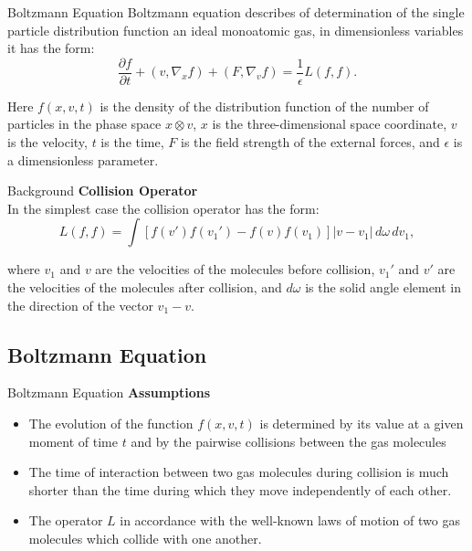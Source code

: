 \documentclass[12pt,xcolor={table,dvipsnames},t]{beamer}
\begin{document}
\begin{frame}{Boltzmann Equation}
Boltzmann equation describes of determination of the single particle distribution function an ideal monoatomic gas, in dimensionless variables it has the form:
\begin{equation}
    \frac{\partial f}{\partial t}+(v,\nabla_xf)+(F,\nabla_vf)=\frac1\epsilon L(f,f).\label{*}\tag{*} 
\end{equation}

Here $f(x,v,t)$ is the density of the distribution function of the number of particles in the phase space $x\otimes v$, $x$ is the three-dimensional space coordinate, $v$ is the velocity, $t$ is the time, $F$ is the field strength of the external forces, and $\epsilon$ is a dimensionless parameter. 
\end{frame}


\begin{frame}{Background}
\textbf{Collision Operator}\\
 In the simplest case the collision operator has the form:
\begin{equation}
L(f,f)=\int[f(v')f(v_1')-f(v)f(v_1)]|v-v_1|\,d\omega\,dv_1, 
\end{equation}

where $v_1$ and $v$ are the velocities of the molecules before collision, $v_1'$ and $v'$ are the velocities of the molecules after collision, and $d\omega$ is the solid angle element in the direction of the vector $v_1-v$.

\end{frame}

\subsection{Boltzmann Equation}
\begin{frame}{Boltzmann Equation}
\textbf{Assumptions}
\begin{itemize}
  \item The evolution of the function $f(x,v,t)$ is determined by its value at a given moment of time $t$ and by the pairwise collisions between the gas molecules
  \item The time of interaction between two gas molecules during collision is much shorter than the time during which they move independently of each other. 
  \item The operator $L$ in accordance with the well-known laws of motion of two gas molecules which collide with one another.
\end{itemize}
\end{frame}
\end{document}
